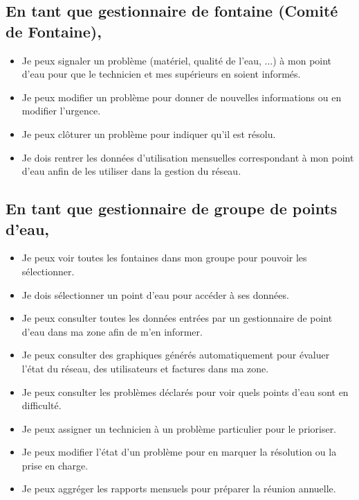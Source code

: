 \documentclass[a4paper, 11pt]{article}
\begin{document}
\subsection{En tant que gestionnaire de fontaine (Comité de Fontaine),}
\begin{itemize}
  \item Je peux signaler un problème (matériel, qualité de l'eau, ...) à mon point d'eau pour que le technicien et mes supérieurs en soient informés.
  \item Je peux modifier un problème pour donner de nouvelles informations ou en modifier l'urgence.
  \item Je peux clôturer un problème pour indiquer qu'il est résolu.
  \item Je dois rentrer les données d'utilisation mensuelles correspondant à mon point d'eau anfin de les utiliser dans la gestion du réseau.
\end{itemize}


\subsection{En tant que gestionnaire de groupe de points d'eau,}
\begin{itemize}
  \item Je peux voir toutes les fontaines dans mon groupe pour pouvoir les sélectionner.
  \item Je dois sélectionner un point d'eau pour accéder à ses données.
  \item Je peux consulter toutes les données entrées par un gestionnaire de point d'eau dans ma zone afin de m'en informer.
  \item Je peux consulter des graphiques générés automatiquement pour évaluer l'état du réseau, des utilisateurs et factures dans ma zone.
  \item Je peux consulter les problèmes déclarés pour voir quels points d'eau sont en difficulté.
  \item Je peux assigner un technicien à un problème particulier pour le prioriser.
  \item Je peux modifier l'état d'un problème pour en marquer la résolution ou la prise en charge.
  \item Je peux aggréger les rapports mensuels pour préparer la réunion annuelle.
\end{itemize}
\end{document}
